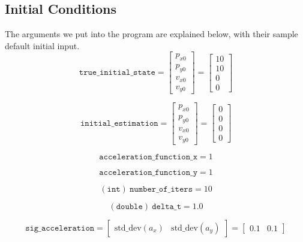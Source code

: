 \documentclass[12pt]{article}
\begin{document}
	\subsection{Initial Conditions}\label{sub:Initial Conditions}
	The arguments we put into the program are explained below, with their sample default initial input.
	\begin{equation}
		\mathtt{true\_initial\_state}=
		\begin{bmatrix}
			p_{x0} \\ p_{y0} \\ v_{x0} \\ v_{y0}
		\end{bmatrix}=
		\begin{bmatrix}
			10 \\ 10 \\ 0 \\ 0
		\end{bmatrix}
	\end{equation}

	\begin{equation}
		\mathtt{initial\_estimation}=
		\begin{bmatrix}
			p_{x0} \\ p_{y0} \\ v_{x0} \\ v_{y0}
		\end{bmatrix}=
		\begin{bmatrix}
			0 \\ 0 \\ 0 \\ 0
		\end{bmatrix}
	\end{equation}

	\begin{equation}
			\mathtt{acceleration\_function\_x}=1
	\end{equation}

	\begin{equation}
			\mathtt{acceleration\_function\_y}=1
	\end{equation}

	\begin{equation}
			(\mathtt{int})\ \mathtt{number\_of\_iters}=10
	\end{equation}

	\begin{equation}
			(\mathtt{double})\ \mathtt{delta\_t}=1.0
	\end{equation}

	\begin{equation}
			\mathtt{sig\_acceleration}=
			\begin{bmatrix}
				\mathrm{std\_dev}(a_x) & \mathrm{std\_dev}(a_y)
			\end{bmatrix}=
			\begin{bmatrix}
				0.1 & 0.1
			\end{bmatrix}
	\end{equation}
\end{document}
